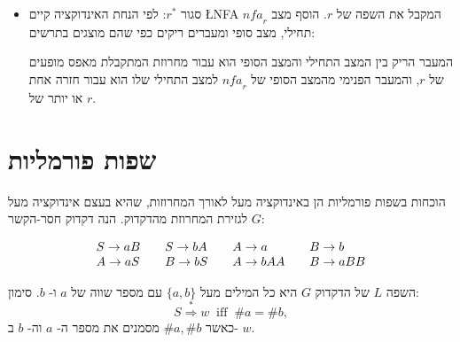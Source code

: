 \begin{itemize}
\item 
סגור
$r^*$:
לפי הנחת האינדוקציה קיים 
\L{\small NFA}
$\mathit{nfa}_r$
המקבל את השפה של
$r$.
הוסף מצב תחילי, מצב סופי ומעברים ריקים כפי שהם מוצגים בתרשים:
\begin{center}
\end{center}
המעבר הריק בין המצב התחילי והמצב הסופי הוא עבור מחרוזת המתקבלת מאפס מופעים של
$r$,
והמעבר הפנימי מהמצב הסופי של
$\mathit{nfa}_r$
למצב התחילי שלו הוא עבור חזרה אחת או יותר של
$r$.
\end{itemize}

\section{%
שפות פורמליות%
}

הוכחות בשפות פורמליות הן באינדוקציה מעל לאורך המחרוזות, שהיא בעצם אינדוקציה מעל לגזירת המחרוזת מהדקדוק. הנה דקדוק חסר-הקשר
$G$:

\begin{displaymath}
\begin{array}{l@{\hspace{2em}}l@{\hspace{2em}}l@{\hspace{2em}}l}
S \rightarrow aB & S \rightarrow bA & A \rightarrow a & B \rightarrow b \\
A \rightarrow aS & B \rightarrow bS & A \rightarrow bAA & B \rightarrow aBB\\
\end{array}
\end{displaymath}

\begin{theorem}
השפה
$L$
של הדקדוק
$G$
היא כל המילים מעל
$\{a,b\}$
עם מספר שווה של
$a$
ו-%
$b$.
סימון:
\begin{displaymath}
S \stackrel{*}{\Rightarrow} w \;\;\mathrm{iff}\;\; \#a = \#b,
\end{displaymath}
כאשר
$\#a,\#b$
מסמנים את מספר ה-%
$a$
וה-%
$b$
ב-%
$w$.
\end{theorem}

